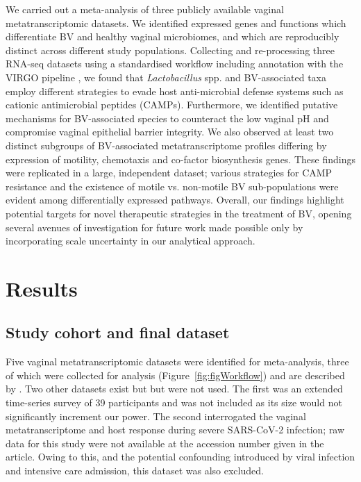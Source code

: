 \documentclass[sn-mathphys,Numbered]{sn-jnl}%
\begin{document}
We carried out a meta-analysis of three publicly available vaginal metatranscriptomic datasets. We identified expressed genes and functions which differentiate BV and healthy vaginal microbiomes, and which are reproducibly distinct across different study populations. Collecting and re-processing three RNA-seq datasets using a standardised workflow including annotation with the VIRGO pipeline \cite{Ma:2020aa}, we found that \textit{Lactobacillus} spp. and BV-associated taxa employ different strategies to evade host anti-microbial defense systems such as cationic antimicrobial peptides (CAMPs). Furthermore, we identified putative mechanisms for BV-associated species to counteract the low vaginal pH and compromise vaginal epithelial barrier integrity. We also observed at least two distinct subgroups of BV-associated metatranscriptome profiles differing by expression of motility, chemotaxis and co-factor biosynthesis genes. These findings were replicated in a large, independent dataset; various strategies for CAMP resistance and the existence of motile vs. non-motile BV sub-populations were evident among differentially expressed pathways. Overall, our findings highlight potential targets for novel therapeutic strategies in the treatment of BV, opening several avenues of investigation for future work made possible only by incorporating scale uncertainty in our analytical approach.

\section{Results}\label{sec:secResults}

\subsection{Study cohort and final dataset}\label{subsec:subsecCohort}
Five vaginal metatranscriptomic datasets were identified for meta-analysis, three of which were collected for analysis (Figure~\ref{fig:figWorkflow}) and are described by \cite{Macklaim:2018aa, Denge00262-18, Fettweis:2019aa}. Two other datasets exist but but were not used. The first \cite{France:2022aa} was an extended time-series survey of 39 participants and was not included as its size would not significantly increment our power. The second \cite{Xiao:2022aa} interrogated the vaginal metatranscriptome and host response during severe SARS-CoV-2 infection; raw data for this study were not available at the accession number given in the article. Owing to this, and the potential confounding introduced by viral infection and intensive care admission, this dataset was also excluded.
\end{document}
